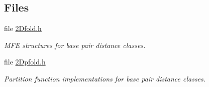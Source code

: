 \subsection*{Files}
\begin{DoxyCompactItemize}
\item 
file \hyperlink{2Dfold_8h}{2\+Dfold.\+h}
\begin{DoxyCompactList}\small\item\em M\+FE structures for base pair distance classes. \end{DoxyCompactList}\item 
file \hyperlink{2Dpfold_8h}{2\+Dpfold.\+h}
\begin{DoxyCompactList}\small\item\em Partition function implementations for base pair distance classes. \end{DoxyCompactList}\end{DoxyCompactItemize}
